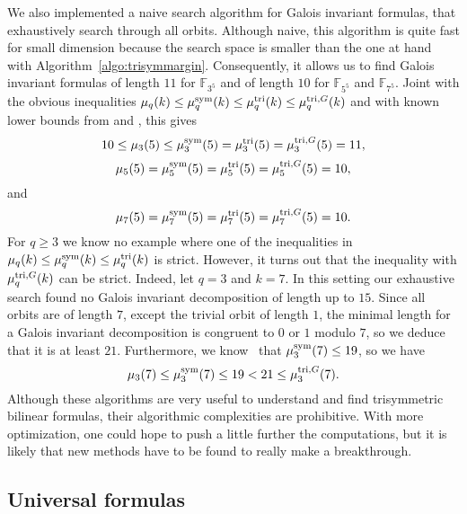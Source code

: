 We also implemented a naive search algorithm for Galois invariant formulas, that
exhaustively search through all orbits. Although naive, this algorithm is quite
fast for small dimension because the search space is smaller than the one at
hand with Algorithm~\ref{algo:trisymmargin}. Consequently, it allows
us to find Galois invariant formulas of length $11$ for $\mathbb{F}_{3^5}$ and
of length $10$ for $\mathbb{F}_{5^5}$ and $\mathbb{F}_{7^5}$.
Joint with the obvious inequalities
$\mu_q(k)\leq\mu^{\textrm{sym}}_q(k)\leq\mu^{\textrm{tri}}_q(k)\leq\mu^{\textrm{tri},G}_q(k)$ and with known lower
bounds from \cite[Thm. 2.2]{BCPRRR19} and \cite{BDEZ12},
this gives 
\[
  10\leq\mu_3(5)\leq\mu^{\textrm{sym}}_3(5)=\mu^{\textrm{tri}}_3(5)=\mu^{\textrm{tri},G}_3(5)=11,
\]
\[
\mu_5(5)=\mu^{\textrm{sym}}_5(5)=\mu^{\textrm{tri}}_5(5)=\mu^{\textrm{tri},G}_5(5)=10,
\]
and 
\[
  \mu_7(5)=\mu^{\textrm{sym}}_7(5)=\mu^{\textrm{tri}}_7(5)=\mu^{\textrm{tri},G}_7(5)=10.
\]
For $q\geq3$ we know no example where one of the inequalities in
$\mu_q(k)\leq\mu^{\textrm{sym}}_q(k)\leq\mu^{\textrm{tri}}_q(k)$ is strict. However, it turns out that
the inequality with $\mu^{\textrm{tri},G}_q(k)$ can be strict. Indeed, let $q=3$ and $k=7$.
In this setting our exhaustive search found no Galois invariant decomposition of
length up to $15$. Since all orbits are of length $7$, except the trivial orbit
of length $1$, the minimal length for a Galois invariant decomposition is congruent
to $0$ or $1$ modulo $7$, so we deduce that it is at least $21$. Furthermore, we
know~\cite[Table~2]{BCPRRR19} that $\mu^{\textrm{sym}}_3(7)\leq19$, so we have
\[
  \mu_3(7)\leq\mu^{\textrm{sym}}_3(7)\leq 19<21\leq \mu^{\textrm{tri},G}_3(7).
\]
Although these algorithms are very useful to understand and find trisymmetric
bilinear formulas, their algorithmic complexities are prohibitive. With more
optimization, one could hope to push a little further the computations, but it
is likely that new methods have to be found to really make a breakthrough.

\subsection{Universal formulas}

